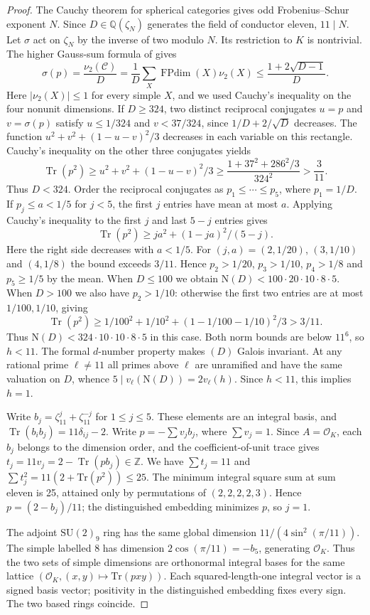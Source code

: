 \documentclass[11pt,a4paper]{article}
\numberwithin{equation}{section}
\begin{document}
\begin{proof}
The Cauchy theorem for spherical categories \cite[Theorem~3.9]{RankFinite} gives odd Frobenius--Schur exponent $N$. Since $D\in\mathbb Q(\zeta_N)$ generates the field of conductor eleven, $11\mid N$. Let $\sigma$ act on $\zeta_N$ by the inverse of two modulo $N$. Its restriction to $K$ is nontrivial. The higher Gauss-sum formula of \cite[Theorem~4.4, equation~(4.17), in the arXiv version]{NSW} gives
\[
 \sigma(p)=\frac{\nu_2(\mathcal C)}{D}
  =\frac{1}{D}\sum_X \operatorname{FPdim}(X)\nu_2(X)
  \le \frac{1+2\sqrt{D-1}}{D}.
\]
Here $|\nu_2(X)|\le1$ for every simple $X$, and we used Cauchy's inequality on the four nonunit dimensions. If $D\ge324$, two distinct reciprocal conjugates $u=p$ and $v=\sigma(p)$ satisfy $u\le1/324$ and $v<37/324$, since $1/D+2/\sqrt D$ decreases. The function $u^2+v^2+(1-u-v)^2/3$ decreases in each variable on this rectangle. Cauchy's inequality on the other three conjugates yields
\[
 \operatorname{Tr}(p^2)\ge
 u^2+v^2+(1-u-v)^2/3\ge
 \frac{1+37^2+286^2/3}{324^2}>\frac3{11}.
\]
Thus $D<324$. Order the reciprocal conjugates as $p_1\le\cdots\le p_5$,
where $p_1=1/D$. If $p_j\le a<1/5$ for $j<5$, the first $j$ entries
have mean at most $a$. Applying Cauchy's inequality to the first $j$ and
last $5-j$ entries gives
\[
 \operatorname{Tr}(p^2)\ge ja^2+(1-ja)^2/(5-j).
\]
Here the right side decreases with $a<1/5$. For $(j,a)=(2,1/20)$,
$(3,1/10)$ and $(4,1/8)$ the bound exceeds $3/11$. Hence
$p_2>1/20$, $p_3>1/10$, $p_4>1/8$ and $p_5\ge1/5$ by the mean.
When $D\le100$ we obtain $\mathrm N(D)<100\cdot20\cdot10\cdot8\cdot5$.
When $D>100$ we also have $p_2>1/10$: otherwise the first two entries
are at most $1/100,1/10$, giving
\[
 \operatorname{Tr}(p^2)\ge 1/100^2+1/10^2+(1-1/100-1/10)^2/3>3/11 .
\]
Thus $\mathrm N(D)<324\cdot10\cdot10\cdot8\cdot5$ in this case.
Both norm bounds are below $11^6$, so $h<11$. The formal $d$-number
property makes $(D)$ Galois invariant. At any rational prime $\ell\ne11$
all primes above $\ell$ are unramified and have the same valuation on
$D$, whence $5\mid v_\ell(\mathrm N(D))=2v_\ell(h)$.
Since $h<11$, this implies $h=1$.

Write $b_j=\zeta_{11}^j+\zeta_{11}^{-j}$ for $1\le j\le5$.
These elements are an integral basis, and
$\operatorname{Tr}(b_i b_j)=11\delta_{ij}-2$.
Write $p=-\sum v_jb_j$, where $\sum v_j=1$. Since $A=\mathcal O_K$, each $b_j$ belongs to the dimension order, and the coefficient-of-unit trace gives $t_j=11v_j=2-\operatorname{Tr}(p b_j)\in\mathbb Z$. We have $\sum t_j=11$ and $\sum t_j^2=11(2+\mathrm{Tr}(p^2))\le25$. The minimum integral square sum at sum eleven is 25, attained only by permutations of $(2,2,2,2,3)$. Hence $p=(2-b_j)/11$; the distinguished embedding minimizes $p$, so $j=1$.

The adjoint $\mathrm{SU}(2)_9$ ring has the same global dimension $11/(4\sin^2(\pi/11))$. The simple labelled $8$ has dimension $2\cos(\pi/11)=-b_5$, generating $\mathcal O_K$. Thus the two sets of simple dimensions are orthonormal integral bases for the same lattice $(\mathcal O_K,(x,y)\mapsto\mathrm{Tr}(pxy))$. Each squared-length-one integral vector is a signed basis vector; positivity in the distinguished embedding fixes every sign. The two based rings coincide.
\end{proof}
\end{document}
